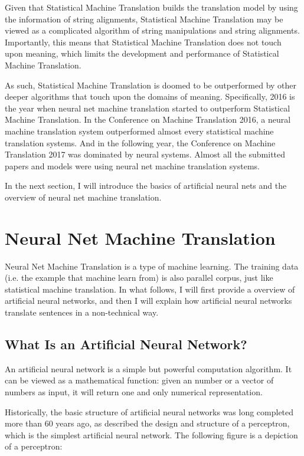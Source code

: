 \documentclass[final]{ua-thesis}
\numberwithin{equation}{section}
\begin{document}
Given that Statistical Machine Translation builds the translation model by using the information of string alignments, Statistical Machine Translation may be viewed as a complicated algorithm of string manipulations and string alignments. 
Importantly, this means that Statistical Machine Translation does not touch upon meaning, which limits the development and performance of Statistical Machine Translation. 

As such, Statistical Machine Translation is doomed to be outperformed by other deeper algorithms that touch upon the domains of meaning. Specifically, 2016 is the year when neural net machine translation started to outperform Statistical Machine Translation. In the Conference on Machine Translation 2016, a neural machine translation system outperformed almost every statistical machine translation systems. And in the following year, the Conference on Machine Translation 2017 was dominated by neural systems. Almost all the submitted papers and models were using neural net machine translation systems. 

In the next section, I will introduce the basics of artificial neural nets and the overview of neural net machine translation.  

\section{Neural Net Machine Translation}\label{neural_MT}

Neural Net Machine Translation is a type of machine learning. The training data (i.e. the example that machine learn from) is also parallel corpus, just like statistical machine translation. 
In what follows, I will first provide a overview of artificial neural networks, and then I will explain how artificial neural networks translate sentences in a non-technical way.

\subsection{What Is an Artificial Neural Network?}

An artificial neural network is a simple but powerful computation algorithm. It can be viewed as a mathematical function: given an number or a vector of numbers as input, it will return one and only numerical representation. 

Historically, the basic structure of artificial neural networks was long completed more than 60 years ago, 
as \citet{rosenblatt} described the design and structure of a perceptron, which is the simplest artificial neural network. The following figure is a depiction of a perceptron: 
\end{document}
